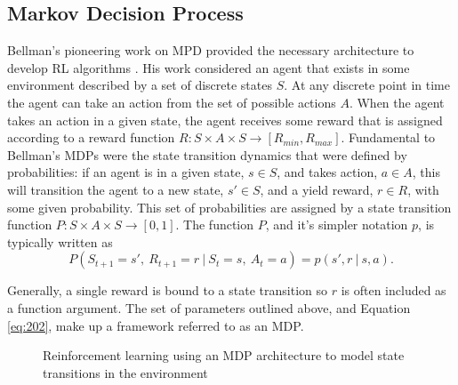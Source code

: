 \subsection{Markov Decision Process}
Bellman's pioneering work on MPD provided the necessary architecture to develop RL algorithms \cite{Bellm1957}. His work considered an agent that exists in some environment described by a set of discrete states $S$. At any discrete point in time the agent can take an action from the set of possible actions $A$. When the agent takes an action in a given state, the agent receives some reward that is assigned according to a reward function $R: S \times A \times S \to [R_{min}, R_{max}]$. Fundamental to Bellman's MDPs were the state transition dynamics that were defined by probabilities: if an agent is in a given state, $s \in S$, and takes action, $a \in A$, this will transition the agent to a new state, $s' \in S$, and a yield reward, $r \in R$, with some given probability. This set of probabilities are assigned by a state transition function $P: S \times A \times S \to [0,1]$. The function $P$, and it's simpler notation $p$, is typically written as
\begin{equation}
	P(S_{t+1} = s', \ R_{t+1} = r \ | \ S_t = s, \ A_t = a) = p(s', r \ | \ s, a). \label{eq:202}
\end{equation}

Generally, a single reward is bound to a state transition so $r$ is often included as a function argument. The set of parameters outlined above, and Equation \ref{eq:202}, make up a framework referred to as an MDP.

\begin{figure}[h]
\centering

\caption[MDP model of reinforcement learning]{Reinforcement learning using an MDP architecture to model state transitions in the environment}
\label{fig:210_reinforcement_learning_problem_mdp}
\end{figure}


